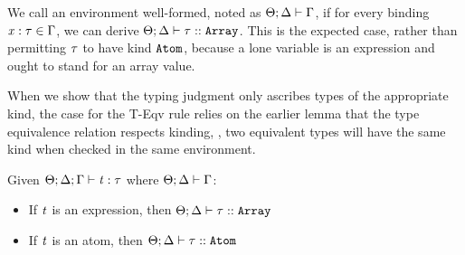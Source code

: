We call an environment well-formed,
noted as $\Theta ; \Delta \vdash \Gamma$,
if for every binding $\mathit{x} : \mathit{\tau} \in \Gamma$,
we can derive $\Theta;\Delta \vdash \mathit{\tau} :: \text{\tt Array}$.
This is the expected case,
rather than permitting $\mathit{\tau}$ to have kind $\text{\tt Atom}$,
because a lone variable is an expression and ought to stand for an array value.

When we show that the typing judgment only ascribes types of the appropriate kind,
the case for the {\sc T-Eqv} rule
relies on the earlier lemma that the type equivalence relation respects kinding,
\ie, two equivalent types will have the same kind
when checked in the same environment.

\begin{theorem}
  \label{wellkinded}
  Given $\Theta;\Delta;\Gamma \vdash \mathit{t} : \mathit{\tau}$ where $\Theta ; \Delta \vdash \Gamma$:
\begin{itemize}
  \item{If $\mathit{t}$ is an expression, then $\Theta;\Delta \vdash \mathit{\tau} :: \text{\tt Array}$}
  \item{If $\mathit{t}$ is an atom, then $\Theta;\Delta \vdash \mathit{\tau} :: \text{\tt Atom}$}
\end{itemize}
\end{theorem}
